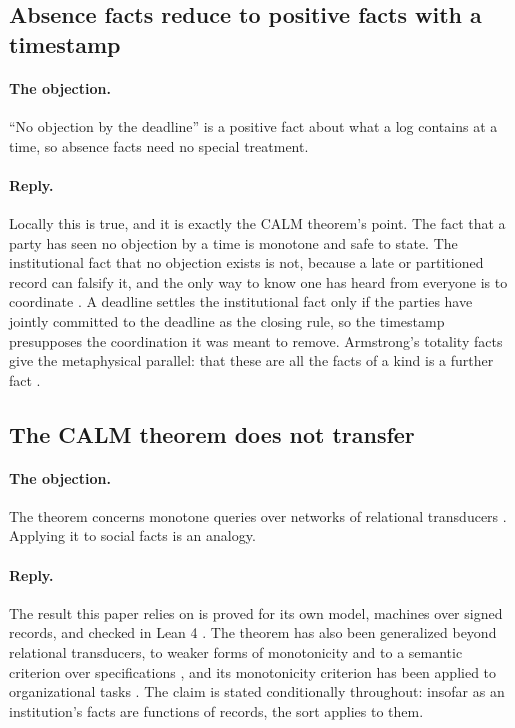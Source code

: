 \subsection{Absence facts reduce to positive facts with a timestamp}\label{sec:obj-timestamp}

\paragraph{The objection.} ``No objection by the deadline'' is a positive fact about what a log
contains at a time, so absence facts need no special treatment.

\paragraph{Reply.} Locally this is true, and it is exactly the CALM theorem's point. The fact that a
party has seen no objection by a time is monotone and safe to state. The institutional fact that no
objection exists is not, because a late or partitioned record can falsify it, and the only way to
know one has heard from everyone is to coordinate \citep{hellerstein2020}. A deadline settles the
institutional fact only if the parties have jointly committed to the deadline as the closing rule,
so the timestamp presupposes the coordination it was meant to remove. Armstrong's totality facts give
the metaphysical parallel: that these are all the facts of a kind is a further fact
\citep[ch.~13]{armstrong1997}.

\subsection{The CALM theorem does not transfer}\label{sec:obj-transfer}

\paragraph{The objection.} The theorem concerns monotone queries over networks of relational
transducers \citep{ameloot2013}. Applying it to social facts is an analogy.

\paragraph{Reply.} The result this paper relies on is proved for its own model, machines over signed
records, and checked in Lean 4 \citep{karna2026}. The theorem has also been generalized beyond
relational transducers, to weaker forms of monotonicity \citep{ameloot2015} and to a semantic
criterion over specifications \citep{hellerstein2026}, and its monotonicity criterion has been applied
to organizational tasks \citep{ju2026}. The claim is stated conditionally throughout: insofar as an institution's facts are
functions of records, the sort applies to them.

